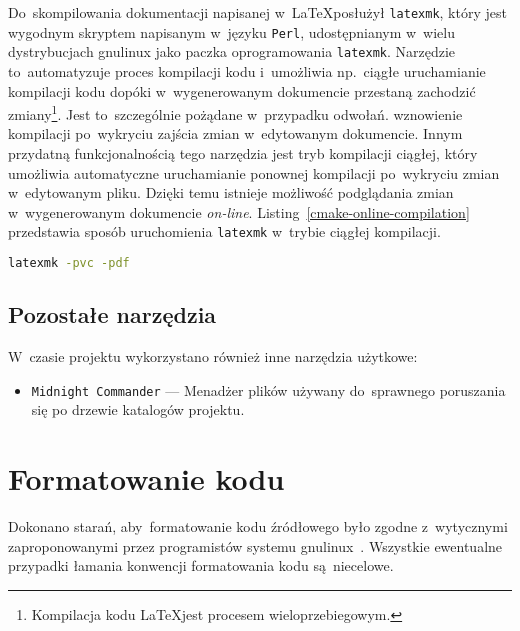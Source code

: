 \documentclass[thesis]{subfiles}
\begin{document}
Do~skompilowania dokumentacji napisanej w~\LaTeX posłużył \texttt{latexmk}, który jest wygodnym skryptem napisanym w~języku \texttt{Perl}, udostępnianym w~wielu dystrybucjach \gls{gnulinux} jako paczka oprogramowania \texttt{latexmk}. Narzędzie to~automatyzuje proces kompilacji kodu i~umożliwia np.~ciągłe uruchamianie kompilacji kodu dopóki w~wygenerowanym dokumencie przestaną zachodzić zmiany\footnote{Kompilacja kodu \LaTeX jest procesem wieloprzebiegowym.}. Jest to~szczególnie pożądane w~przypadku odwołań. wznowienie kompilacji po~wykryciu zajścia zmian w~edytowanym dokumencie. Innym przydatną funkcjonalnością tego narzędzia jest tryb kompilacji ciągłej, który umożliwia automatyczne uruchamianie ponownej kompilacji po~wykryciu zmian w~edytowanym pliku. Dzięki temu istnieje możliwość podglądania zmian w~wygenerowanym dokumencie \emph{on-line}. Listing~\ref{cmake-online-compilation} przedstawia sposób uruchomienia \texttt{latexmk} w~trybie ciągłej kompilacji.

\begin{lstlisting}[label=cmake-online-compilation,language=bash,numbers=none,caption={Uruchomienie ciągłej kompilacji domyślnego pliku \LaTeX, znalezionego w~aktualnym katalogu roboczym, do~pliku wyjściowego w~formacie~PDF}]
latexmk -pvc -pdf
\end{lstlisting}


\subsection{Pozostałe narzędzia}

W~czasie projektu wykorzystano również inne narzędzia użytkowe:
\begin{itemize}
\item \texttt{Midnight~Commander} --- Menadżer plików używany do~sprawnego poruszania się po drzewie katalogów projektu.
\end{itemize}


\section{Formatowanie kodu}

Dokonano starań, aby~formatowanie kodu źródłowego było zgodne z~wytycznymi zaproponowanymi przez programistów  systemu \gls{gnulinux}~\cite{kernel-coding-style}. Wszystkie ewentualne przypadki łamania konwencji formatowania kodu są~niecelowe.
\end{document}
